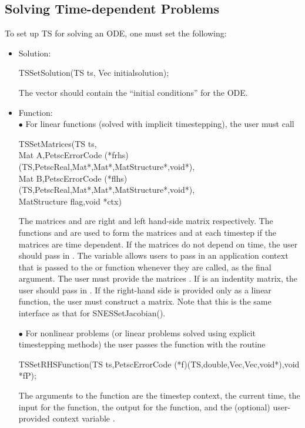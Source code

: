 \subsection{Solving Time-dependent Problems}
To set up TS for solving an ODE, one must set the following:

\begin{itemize}
\item Solution:\\
\begin{tabbing}
 TSSetSolution(TS ts, Vec initialsolution);
\end{tabbing}
The vector  should contain the ``initial conditions''
for the ODE. 

\item Function: \\
\subitem $ \bullet $ For linear functions (solved with implicit timestepping),
 the user must call 
\begin{tabbing}
TSSetMatrices(TS ts,\\
Mat A,PetscErrorCode (*frhs)(TS,PetscReal,Mat*,Mat*,MatStructure*,void*),\\
Mat B,PetscErrorCode (*flhs)(TS,PetscReal,Mat*,Mat*,MatStructure*,void*),\\
MatStructure flag,void *ctx)
\end{tabbing}
The matrices  and  are right and left hand-side matrix respectively.
The functions  and  are used to form the matrices  and  
at each timestep if the matrices are time dependent.
If the matrices do not depend on time, the user should 
pass in .  The variable  allows 
users to pass in an application context that is passed to the  or  function 
whenever they are called, as the final argument. The user must provide the matrices
. If  is an indentity matrix, the user should pass in . 
If the right-hand side is provided only as a linear
function, the user must construct a  matrix. Note that this is 
the same interface as that for SNESSetJacobian(). 

\subitem $ \bullet $  For nonlinear problems (or linear problems solved using
explicit timestepping methods) the user  passes the function with 
the routine

\begin{tabbing}
 TSSetRHSFunction(TS ts,PetscErrorCode (*f)(TS,double,Vec,Vec,void*),void *fP);
\end{tabbing}
The  arguments to the function  are
the timestep context, the current time, the input for the function,
the output for the function, and the (optional) user-provided context
variable .


\end{itemize}
